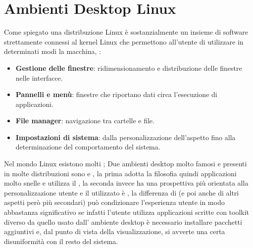 \section{Ambienti Desktop Linux}
\label{sec:Ambienti-Desktop-Linux}
Come spiegato una distribuzione Linux è sostanzialmente un insieme di software strettamente connessi al kernel Linux che permettono all'utente di utilizzare in determinati modi la macchina, :
\begin{itemize}
    \item \textbf{Gestione delle finestre}: ridimensionamento e distribuzione delle finestre nelle interfacce.
    \item \textbf{Pannelli e menù}: finestre che riportano dati circa l'esecuzione di applicazioni. 
    \item \textbf{File manager}: navigazione tra cartelle e file. 
    \item \textbf{Impostazioni di sistema}: dalla personalizzazione dell'aspetto fino alla determinazione del comportamento del sistema.
\end{itemize}
Nel mondo Linux esistono molti ; Due ambienti desktop molto famosi e presenti in molte distribuzioni sono  e , la prima adotta la filosofia  quindi applicazioni molto snelle e utilizza il , la seconda invece ha una prospettiva più orientata alla personalizzazione utente e il  utilizzato è , la differenza di  (e poi anche di altri aspetti però più secondari) può condizionare l'esperienza utente in modo abbastanza significativo se infatti l'utente utilizza applicazioni scritte con toolkit diverso da quello usato dall' ambiente desktop è necessario installare pacchetti aggiuntivi e, dal punto di vista della visualizzazione, si avverte una certa disuniformità con il resto del sistema.


